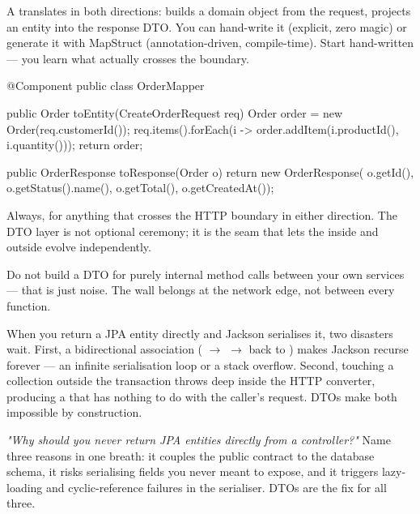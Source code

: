  A  translates in both directions:  builds a domain object from the request,  projects an entity into the response DTO. You can hand-write it (explicit, zero magic) or generate it with MapStruct (annotation-driven, compile-time). Start hand-written --- you learn what actually crosses the boundary.

\begin{javabox}
@Component
public class OrderMapper {

  public Order toEntity(CreateOrderRequest req) {
    Order order = new Order(req.customerId());
    req.items().forEach(i ->
        order.addItem(i.productId(), i.quantity()));
    return order;
  }

  public OrderResponse toResponse(Order o) {
    return new OrderResponse(
        o.getId(), o.getStatus().name(), o.getTotal(), o.getCreatedAt());
  }
}
\end{javabox}

 Always, for anything that crosses the HTTP boundary in either direction. The DTO layer is not optional ceremony; it is the seam that lets the inside and outside evolve independently.

 Do not build a DTO for purely internal method calls between your own services --- that is just noise. The wall belongs at the network edge, not between every function.

\begin{behind}
When you return a JPA entity directly and Jackson serialises it, two disasters wait. First, a bidirectional association ( $\rightarrow$  $\rightarrow$ back to ) makes Jackson recurse forever --- an infinite serialisation loop or a stack overflow. Second, touching a  collection outside the transaction throws  deep inside the HTTP converter, producing a  that has nothing to do with the caller's request. DTOs make both impossible by construction.
\end{behind}

\begin{interview}
\emph{"Why should you never return JPA entities directly from a controller?"} Name three reasons in one breath: it couples the public contract to the database schema, it risks serialising fields you never meant to expose, and it triggers lazy-loading and cyclic-reference failures in the serialiser. DTOs are the fix for all three.
\end{interview}

